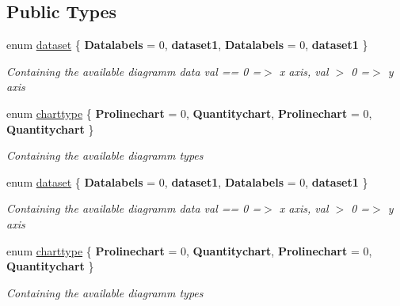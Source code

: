 \subsection*{Public Types}
\begin{DoxyCompactItemize}
\item 
enum \hyperlink{classkpi_mvc_api_1_1_data_transfer_objects_1_1_production_data_dto_rs_ab356c7600182705746e7b61967dd63df}{dataset} \{ {\bfseries Datalabels} = 0, 
{\bfseries dataset1}, 
{\bfseries Datalabels} = 0, 
{\bfseries dataset1}
 \}\begin{DoxyCompactList}\small\item\em Containing the available diagramm data val == 0 =$>$ x axis, val $>$ 0 =$>$ y axis \end{DoxyCompactList}
\item 
enum \hyperlink{classkpi_mvc_api_1_1_data_transfer_objects_1_1_production_data_dto_rs_a45716f0cdee396710530b9562be56f9a}{charttype} \{ {\bfseries Prolinechart} = 0, 
{\bfseries Quantitychart}, 
{\bfseries Prolinechart} = 0, 
{\bfseries Quantitychart}
 \}\begin{DoxyCompactList}\small\item\em Containing the available diagramm types \end{DoxyCompactList}
\item 
enum \hyperlink{classkpi_mvc_api_1_1_data_transfer_objects_1_1_production_data_dto_rs_ab356c7600182705746e7b61967dd63df}{dataset} \{ {\bfseries Datalabels} = 0, 
{\bfseries dataset1}, 
{\bfseries Datalabels} = 0, 
{\bfseries dataset1}
 \}\begin{DoxyCompactList}\small\item\em Containing the available diagramm data val == 0 =$>$ x axis, val $>$ 0 =$>$ y axis \end{DoxyCompactList}
\item 
enum \hyperlink{classkpi_mvc_api_1_1_data_transfer_objects_1_1_production_data_dto_rs_a45716f0cdee396710530b9562be56f9a}{charttype} \{ {\bfseries Prolinechart} = 0, 
{\bfseries Quantitychart}, 
{\bfseries Prolinechart} = 0, 
{\bfseries Quantitychart}
 \}\begin{DoxyCompactList}\small\item\em Containing the available diagramm types \end{DoxyCompactList}
\end{DoxyCompactItemize}
